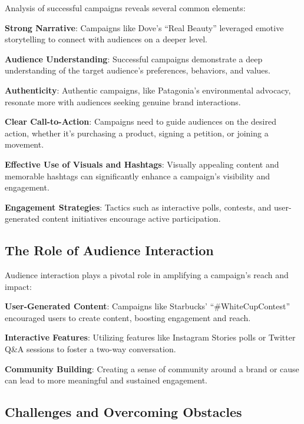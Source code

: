 \documentclass[
]{book}
\begin{document}
Analysis of successful campaigns reveals several common elements:

\textbf{Strong Narrative}: Campaigns like Dove's ``Real Beauty'' leveraged emotive storytelling to connect with audiences on a deeper level.

\textbf{Audience Understanding}: Successful campaigns demonstrate a deep understanding of the target audience's preferences, behaviors, and values.

\textbf{Authenticity}: Authentic campaigns, like Patagonia's environmental advocacy, resonate more with audiences seeking genuine brand interactions.

\textbf{Clear Call-to-Action}: Campaigns need to guide audiences on the desired action, whether it's purchasing a product, signing a petition, or joining a movement.

\textbf{Effective Use of Visuals and Hashtags}: Visually appealing content and memorable hashtags can significantly enhance a campaign's visibility and engagement.

\textbf{Engagement Strategies}: Tactics such as interactive polls, contests, and user-generated content initiatives encourage active participation.

\hypertarget{the-role-of-audience-interaction}{%
\subsection{The Role of Audience Interaction}\label{the-role-of-audience-interaction}}

Audience interaction plays a pivotal role in amplifying a campaign's reach and impact:

\textbf{User-Generated Content}: Campaigns like Starbucks' ``\#WhiteCupContest'' encouraged users to create content, boosting engagement and reach.

\textbf{Interactive Features}: Utilizing features like Instagram Stories polls or Twitter Q\&A sessions to foster a two-way conversation.

\textbf{Community Building}: Creating a sense of community around a brand or cause can lead to more meaningful and sustained engagement.

\hypertarget{challenges-and-overcoming-obstacles}{%
\subsection{Challenges and Overcoming Obstacles}\label{challenges-and-overcoming-obstacles}}
\end{document}
